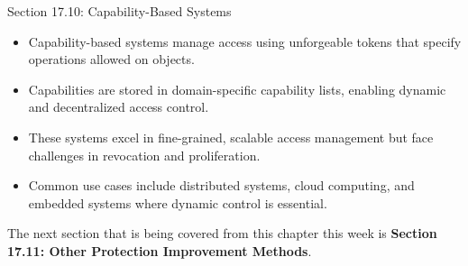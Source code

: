 \begin{notes}{Section 17.10: Capability-Based Systems}
    \begin{highlight}
        \begin{itemize}
            \item Capability-based systems manage access using unforgeable tokens that specify operations allowed on objects.
            \item Capabilities are stored in domain-specific capability lists, enabling dynamic and decentralized access control.
            \item These systems excel in fine-grained, scalable access management but face challenges in revocation and proliferation.
            \item Common use cases include distributed systems, cloud computing, and embedded systems where dynamic control is essential.
        \end{itemize}
    \end{highlight}
\end{notes}

The next section that is being covered from this chapter this week is \textbf{Section 17.11: Other Protection Improvement Methods}.

